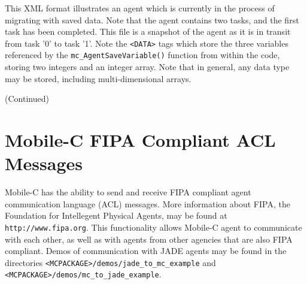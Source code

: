 \documentclass[11pt]{report}
\begin{document}
\begin{Program}[ph]
\begin{center}
{\footnotesize \linespread{1.0}
}
\end{center}
\caption{\label{prog:migrating_agent} This XML format illustrates an agent which is currently
in the process of migrating with saved data. Note that the agent contains two tasks, and the
first task has been completed. This file is a snapshot of the agent as it is in transit from
task '0' to task '1'. Note the \texttt{<DATA>} tags which store the three variables
referenced by the \texttt{mc\_AgentSaveVariable()} function from within the code, storing
two integers and an integer array. Note that in general, any data type may be stored, including
multi-dimensional arrays.}
\end{Program}
\addtocounter{Program}{-1}
\begin{Program}[ph]
\begin{center}
{\footnotesize \linespread{1.0}
}
\end{center}
\caption{(Continued)}
\end{Program}



\chapter{Mobile-C FIPA Compliant ACL Messages \label{chap:fipa}}
Mobile-C has the ability to send and receive FIPA compliant
agent communication language (ACL) messages. More information
about FIPA, the Foundation for Intellegent Physical Agents, may be
found at \texttt{http://www.fipa.org}. This functionality allows
Mobile-C agent to communicate with each other, as well as with 
agents from other agencies that are also FIPA compliant. Demos
of communication with JADE agents may be found in the directories
\texttt{<MCPACKAGE>/demos/jade\_to\_mc\_example} and \\
\texttt{<MCPACKAGE>/demos/mc\_to\_jade\_example}.

\end{document}

